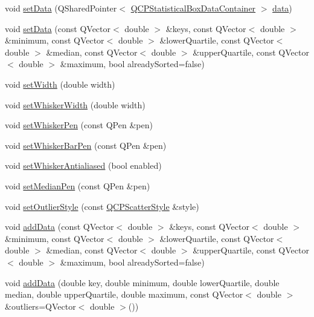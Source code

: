 \begin{DoxyCompactItemize}
\item 
void \hyperlink{classQCPStatisticalBox_a08a6da55822bad825ee25a8069b9b52f}{set\+Data} (Q\+Shared\+Pointer$<$ \hyperlink{classQCPDataContainer}{Q\+C\+P\+Statistical\+Box\+Data\+Container} $>$ \hyperlink{classQCPStatisticalBox_a99de828ddad81bb79aaed7db54b87e3f}{data})
\item 
void \hyperlink{classQCPStatisticalBox_a4ae198e66243d8cc57ad8893c37bf9d4}{set\+Data} (const Q\+Vector$<$ double $>$ \&keys, const Q\+Vector$<$ double $>$ \&minimum, const Q\+Vector$<$ double $>$ \&lower\+Quartile, const Q\+Vector$<$ double $>$ \&median, const Q\+Vector$<$ double $>$ \&upper\+Quartile, const Q\+Vector$<$ double $>$ \&maximum, bool already\+Sorted=false)
\item 
void \hyperlink{classQCPStatisticalBox_a0b62775bd67301b1eba5c785f2b26f14}{set\+Width} (double width)
\item 
void \hyperlink{classQCPStatisticalBox_adf378812446bd66f34d1f7f293d991cd}{set\+Whisker\+Width} (double width)
\item 
void \hyperlink{classQCPStatisticalBox_a4a5034cb3b9b040444df05ab1684620b}{set\+Whisker\+Pen} (const Q\+Pen \&pen)
\item 
void \hyperlink{classQCPStatisticalBox_aa8d3e503897788e1abf68dc74b5f147f}{set\+Whisker\+Bar\+Pen} (const Q\+Pen \&pen)
\item 
void \hyperlink{classQCPStatisticalBox_a61bcd458fba002f72304d11319051843}{set\+Whisker\+Antialiased} (bool enabled)
\item 
void \hyperlink{classQCPStatisticalBox_a7260ac55b669f5d0a74f16d5ca84c52c}{set\+Median\+Pen} (const Q\+Pen \&pen)
\item 
void \hyperlink{classQCPStatisticalBox_ad5241943422eb8e58360a97e99ad6aa7}{set\+Outlier\+Style} (const \hyperlink{classQCPScatterStyle}{Q\+C\+P\+Scatter\+Style} \&style)
\item 
void \hyperlink{classQCPStatisticalBox_a9a8739c5b8291db8fd839e892fc8f478}{add\+Data} (const Q\+Vector$<$ double $>$ \&keys, const Q\+Vector$<$ double $>$ \&minimum, const Q\+Vector$<$ double $>$ \&lower\+Quartile, const Q\+Vector$<$ double $>$ \&median, const Q\+Vector$<$ double $>$ \&upper\+Quartile, const Q\+Vector$<$ double $>$ \&maximum, bool already\+Sorted=false)
\item 
void \hyperlink{classQCPStatisticalBox_a026f2790b530d6f29312254ecb1e7c1e}{add\+Data} (double key, double minimum, double lower\+Quartile, double median, double upper\+Quartile, double maximum, const Q\+Vector$<$ double $>$ \&outliers=Q\+Vector$<$ double $>$())

\end{DoxyCompactItemize}
